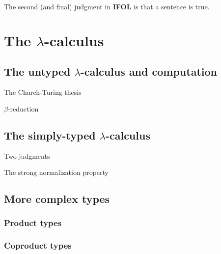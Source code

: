 \documentclass[12pt,twoside,draft]{reedthesis}
\makeatletter
\let\oldindex\index
\renewcommand{\index}[1]{\oldindex{#1}\marginpar{\footnotesize\color{index}index: #1}}
\newcommand{\indeX}[1]{\oldindex{#1}}
\newcommand{\abbreviation}[1]{\textbf{#1}\indeX{#1@\textbf{#1}}} %
\newcommand{\prop}{\hspace{0.4em}\text{prop}}
\makeatother
\begin{document}

The second (and final) judgment in \abbreviation{IFOL} is that a sentence is
true. 

\section{The $\lambda$-calculus}
\label{sec:the-lambda-calculus}

\subsection{The untyped $\lambda$-calculus and computation}
\label{subsec:the-untyped-lambda-calculus}

The Church-Turing thesis

$\beta$-reduction

\subsection{The simply-typed $\lambda$-calculus}
\label{subsec:the-simply-typed-lambda-calculus}

Two judgments

The strong normalization property

\subsection{More complex types}
\label{subsec:more-complex-types}

\subsubsection{Product types}
\label{subsubsec:product-types}

\subsubsection{Coproduct types}
\label{subsubsec:coproduct-types}
\end{document}
